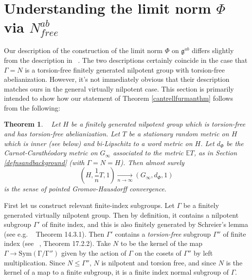 \documentclass[12pt,reqno]{article}
\numberwithin{equation}{section}
\newcommand{\E}{\mathbb{E}}
\newcommand{\tendsto}[2]{\xrightarrow[#1 \to #2]{}}
\newcommand{\g}{\mathfrak{g}}
\newtheorem{thm}{Theorem}
\begin{document}
 
 
 
 
 
 
 
 
 
 
 
 
 
 

\section{Understanding the limit norm $\Phi$ via $N^{ab}_{free}$} \label{grouptheory}

Our description of the construction of the limit norm $\Phi$ on $\g^{ab}$ differs slightly from the description in ~\cite{CantrellFurman}.
The two descriptions certainly coincide  in the case that $\Gamma=N$ is a torsion-free finitely generated nilpotent group with 
torsion-free abelianization. However, it's not immediately obvious that their description matches ours in the general
virtually nilpotent case. This section is primarily intended to show how our statement of Theorem \ref{cantrellfurmanthm} follows
from the following:
\begin{thm}{~\cite{CantrellFurman}}
Let $H$ be a finitely generated nilpotent group which is torsion-free and has torsion-free abelianization. Let $T$ be a
stationary random metric on $H$ which is \emph{inner} (see below) and bi-Lipschitz to a word metric on $H$.
Let $d_{\Phi}$ be the Carnot-Carath\'eodory
 metric on $G_{\infty}$ associated to the metric $\E T$, as in Section \ref{defnsandbackground} (with $\Gamma=N=H$). Then almost surely
 \[ (H, \frac{1}{n} T, 1) \tendsto{n}{\infty} (G_{\infty}, d_{\Phi}, 1) \]
 is the sense of pointed Gromov-Hausdorff convergence.
\end{thm}

First let us construct relevant finite-index subgroups. 
Let $\Gamma$ be a finitely generated virtually nilpotent group. 
Then by definition, it contains a nilpotent subgroup $\Gamma'$ of finite index, and this 
is also finitely generated by Schreier's lemma (see e.g. ~\cite{KarMer} Theorem 14.3.1). 
Then $\Gamma'$ contains a \emph{torsion-free} subgroup $\Gamma''$ of finite index (see ~\cite{KarMer}, Theorem 17.2.2).
Take $N$ to be the kernel of the map $\Gamma \to \mathrm{Sym(\Gamma/\Gamma'')}$ given by the action of $\Gamma$
on the cosets of $\Gamma''$ by left multiplication.
Since $N \le \Gamma''$, $N$ is nilpotent and torsion free, and since $N$ is the kernel of a map to a finite subgroup,
it is a finite index normal subgroup of $\Gamma$.
\end{document}
